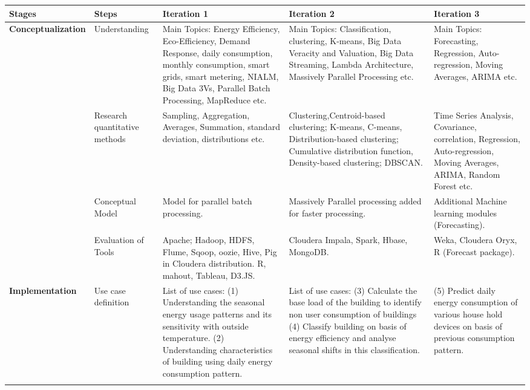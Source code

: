 \begin{table}\tiny %
\begin{tabular}{|m{2.2cm}|>{\raggedright}m{1.7cm}|>{\raggedright}m{3.4cm}|>{\raggedright}m{3.4cm}|m{3.4cm}|}
\hline
	\textbf{Stages} & \textbf{Steps} & \textbf{Iteration 1} & \textbf{Iteration 2} & \textbf{Iteration 3} \\ \hline
	\multirow{4}{*}{\textbf{Conceptualization}} & Understanding  & Main Topics: Energy Efficiency, Eco-Efficiency, Demand Response, daily consumption, monthly consumption, smart grids, smart metering, NIALM, Big Data 3Vs, Parallel Batch Processing, MapReduce etc. & Main Topics: Classification, clustering, K-means, Big Data Veracity and Valuation, Big Data Streaming, Lambda Architecture, Massively Parallel Processing etc. & Main Topics: Forecasting, Regression, Auto-regression, Moving Averages, ARIMA etc. \\ \cline{2-5}
	 & Research quantitative methods
 & Sampling, Aggregation,  Averages, Summation, standard deviation, distributions etc. & Clustering,Centroid-based clustering; K-means, C-means, Distribution-based clustering; Cumulative distribution function,  Density-based clustering; DBSCAN.  & Time Series Analysis, Covariance, correlation, Regression, Auto-regression, Moving Averages, ARIMA, Random Forest etc. \\  \cline{2-5}
	 & Conceptual Model & Model for parallel batch processing. & Massively Parallel processing added for faster processing. & Additional Machine learning modules (Forecasting). \\  \cline{2-5}
	 & Evaluation of Tools & Apache; Hadoop, HDFS, Flume, Sqoop, oozie, Hive, Pig in Cloudera distribution.
R, mahout, Tableau, D3.JS.  & Cloudera Impala, Spark, Hbase, MongoDB. & Weka, Cloudera Oryx,  R (Forecast package). \\ \hline
\multirow{4}{*}{\textbf{Implementation}} & Use case definition
 & List of use cases:
(1) Understanding the seasonal energy usage patterns and its sensitivity with outside temperature.
(2) Understanding characteristics of building using daily energy consumption pattern. & List of use cases:
(3) Calculate the base load of the building to identify non user consumption of buildings
(4) Classify building on basis of energy efficiency and analyse seasonal shifts in this classification. & (5) Predict daily energy consumption of various house hold devices on basis of previous consumption pattern. \\ \cline{2-5}

\end{tabular}
\end{table}
